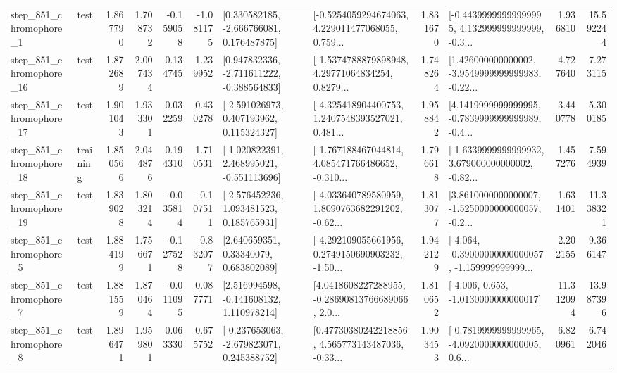 \begin{tabular}{llrrrrllrlrr}
   step\_851\_chromophore\_1 &      test &      1.867790 &    1.708732 &     -0.159058 & -1.081175 &    [0.330582185, -2.666766081, 0.176487875] &  [-0.5254059294674063, 4.229011477068055, 0.759... &       1.831670 &  [-0.44399999999999995, 4.132999999999999, -0.3... &            1.936810 &         15.592244 \\
  step\_851\_chromophore\_16 &      test &      1.872689 &    2.007434 &      0.134745 &  1.239952 &   [0.947832336, -2.711611222, -0.388564833] &  [-1.5374788879898948, 4.29771064834254, 0.8279... &       1.748264 &  [1.426000000000002, -3.9549999999999983, -0.22... &            4.727640 &          7.273115 \\
  step\_851\_chromophore\_17 &      test &      1.901043 &    1.933301 &      0.032259 &  0.430278 &    [-2.591026973, 0.407193962, 0.115324327] &  [-4.325418904400753, 1.2407548393527021, 0.481... &       1.958842 &  [4.1419999999999995, -0.7839999999999989, -0.4... &            3.440778 &          5.300185 \\
  step\_851\_chromophore\_18 &  training &      1.850566 &    2.044876 &      0.194310 &  1.710531 &   [-1.020822391, 2.468995021, -0.551113696] &  [-1.767188467044814, 4.085471766486652, -0.310... &       1.796618 &  [-1.6339999999999932, 3.679000000000002, -0.82... &            1.457276 &          7.594939 \\
  step\_851\_chromophore\_19 &      test &      1.839028 &    1.803214 &     -0.035814 & -0.107511 &    [-2.576452236, 1.093481523, 0.185765931] &  [-4.033640789580959, 1.8090763682291202, -0.62... &       1.813077 &  [3.8610000000000007, -1.5250000000000057, -0.2... &            1.631401 &         11.338321 \\
   step\_851\_chromophore\_5 &      test &      1.884199 &    1.756671 &     -0.127528 & -0.832077 &      [2.640659351, 0.33340079, 0.683802089] &  [-4.292109055661956, 0.2749150690903232, -1.50... &       1.942129 &  [-4.064, -0.39000000000000057, -1.159999999999... &            2.202155 &          9.366147 \\
   step\_851\_chromophore\_7 &      test &      1.881559 &    1.870464 &     -0.011095 &  0.087771 &    [2.516994598, -0.141608132, 1.110978214] &  [4.0418608227288955, -0.28690813766689066, 2.0... &       1.810652 &               [-4.006, 0.653, -1.0130000000000017] &           11.312094 &         13.987396 \\
   step\_851\_chromophore\_8 &      test &      1.896471 &    1.959801 &      0.063330 &  0.675752 &   [-0.237653063, -2.679823071, 0.245388752] &  [0.47730380242218856, 4.565773143487036, -0.33... &       1.903453 &  [-0.7819999999999965, -4.0920000000000005, 0.6... &            6.820961 &          6.742046 \\

\end{tabular}

